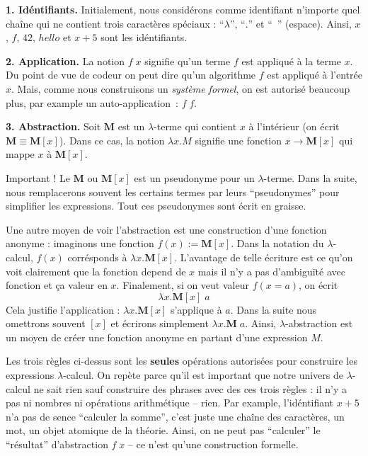 
\textbf{1. Idéntifiants.} Initialement, nous considérons comme identifiant n'importe quel chaîne qui ne contient trois caractères spéciaux : ``$\lambda$'', ``$.$'' et ``~'' (espace).
Ainsi, $x$, $f$, $42$, $hello$ et $x+5$ sont les idéntifiants.

\textbf{2. Application.} La notion $f \; x$ signifie qu'un terme $f$ est appliqué à la terme $x$. Du point de vue de codeur on peut dire qu'un algorithme $f$ est appliqué à l'entrée $x$. Mais, comme nous construisons un \emph{système formel}, on est autorisé beaucoup plus, par example un auto-application~: $f \; f$.

\textbf{3. Abstraction.} Soit $\mathbf{M}$ est un $\lambda$-terme qui contient $x$ à l'intérieur (on écrit $\mathbf{M} \equiv \mathbf{M}[x]$). Dans ce cas, la notion $\lambda x.M$ signifie une fonction $x \to \mathbf{M}[x]$ qui mappe $x$ à $\mathbf{M}[x]$.
\begin{remark}
Important ! Le $\mathbf{M}$ ou $\mathbf{M}[x]$ est un pseudonyme pour un $\lambda$-terme. Dans la suite, nous remplacerons souvent les certains termes par leurs ``pseudonymes'' pour simplifier les expressions. Tout ces pseudonymes sont écrit en graisse.
\end{remark}
Une autre moyen de voir l'abstraction est une construction d'une fonction anonyme : imaginons une fonction $f(x) := \mathbf{M}[x]$. Dans la notation du $\lambda$-calcul, $f(x)$ corrésponds à $\lambda x.\mathbf{M}[x]$. L'avantage de telle écriture est ce qu'on voit clairement que la fonction depend de $x$ mais il n'y a pas d'ambiguïté avec fonction et ça valeur en $x$. Finalement, si on veut valeur $f(x=a)$, on écrit $$\lambda x. \mathbf{M}[x] \; a$$
Cela justifie l'application : $\lambda x. \mathbf{M}[x]$ s'applique à $a$.
Dans la suite nous omettrons souvent $[x]$ et écrirons simplement $\lambda x. \mathbf{M} \; a$.
Ainsi, $\lambda$-abstraction est un moyen de créer une fonction anonyme en partant d'une expression $M$.

Les trois règles ci-dessus sont les \textbf{seules} opérations autorisées pour construire les expressions $\lambda$-calcul.
On repète parce qu'il est important que notre univers de $\lambda$-calcul ne sait rien sauf construire des phrases avec des ces trois règles : il n'y a pas ni nombres ni opérations arithmétique -- rien.
Par example, l'idéntifiant $x+5$ n'a pas de sence ``calculer la somme'', c'est juste une chaîne des caractères, un mot, un objet atomique de la théorie.
Ainsi, on ne peut pas ``calculer'' le ``résultat'' d'abstraction $f \; x$ -- ce n'est qu'une construction formelle.

